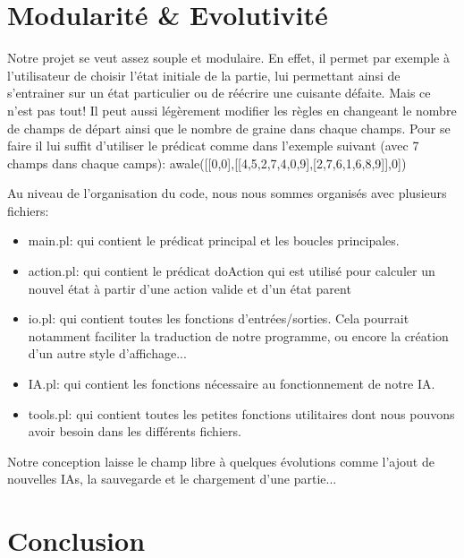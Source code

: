 \documentclass[]{article}
\begin{document}
\section{Modularité \& Evolutivité}

Notre projet se veut assez souple et modulaire. En effet, il permet par exemple à l'utilisateur de choisir l'état initiale de la partie, lui permettant ainsi de s'entrainer sur un état particulier ou de réécrire une cuisante défaite.
Mais ce n'est pas tout! Il peut aussi légèrement modifier les règles en changeant le nombre de champs de départ ainsi que le nombre de graine dans chaque champs. Pour se faire il lui suffit d'utiliser le prédicat comme dans l'exemple suivant (avec 7 champs dans chaque camps):
	awale([[0,0],[[4,5,2,7,4,0,9],[2,7,6,1,6,8,9]],0])
	
Au niveau de l'organisation du code, nous nous sommes organisés avec plusieurs fichiers:
\begin{itemize}
\item main.pl:		qui contient le prédicat principal et les boucles principales.
\item action.pl:		qui contient le prédicat doAction qui est utilisé pour calculer un nouvel état à partir d'une action valide et d'un état parent
\item io.pl:			qui contient toutes les fonctions d'entrées/sorties. Cela pourrait notamment faciliter la traduction de notre programme, ou encore la création d'un autre style d'affichage...
\item IA.pl:			qui contient les fonctions nécessaire au fonctionnement de notre IA.
\item tools.pl:		qui contient toutes les petites fonctions utilitaires dont nous pouvons avoir besoin dans les différents fichiers.
\end{itemize}


	
Notre conception laisse le champ libre à quelques évolutions comme l'ajout de nouvelles IAs, la sauvegarde et le chargement d'une partie... 

\section{Conclusion}
\end{document}

